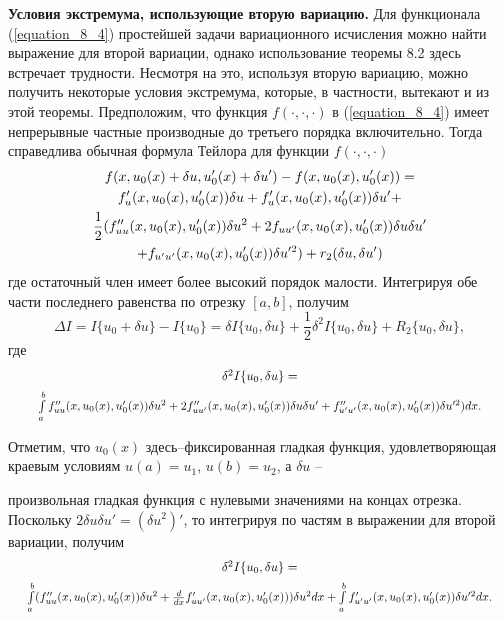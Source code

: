 {\bf Условия экстремума, использующие вторую вариацию.} Для функционала (\ref{equation_8_4}) простейшей задачи вариационного исчисления можно найти выражение для второй вариации, однако использование теоремы 8.2 здесь встречает трудности. Несмотря на это, используя вторую вариацию, можно получить некоторые условия экстремума, которые, в частности, вытекают и из этой теоремы. Предположим, что функция $f(\cdot,\cdot,\cdot)$ в (\ref{equation_8_4}) имеет непрерывные частные производные до третьего порядка включительно. Тогда справедлива обычная формула Тейлора для функции $f(\cdot,\cdot,\cdot)$
	\begin{gather}
		f(x, u_0(x)+\delta u, u_0'(x)+\delta u') - f(x, u_0(x), u_0'(x)) = \notag\\
		f_u'(x, u_0(x), u_0'(x))\delta u + f_u'(x, u_0(x), u_0'(x))\delta u' + \notag\\
		\frac{1}{2}(f_{uu}''(x, u_0(x), u_0'(x))\delta u^2 + 2f_{u{u}'}(x, u_0(x), u_0'(x))\delta u\delta u' \notag\\
		+ f_{u'u'}(x, u_0(x), u_0'(x))\delta u'^2) + r_2(\delta u, \delta u') \notag
	\end{gather}
	где остаточный член имеет более высокий порядок малости. Интегрируя обе части последнего равенства по отрезку $[a, b]$, получим
	$$\Delta I=I\{u_0+\delta u\}-I\{u_0\}=\delta I\{u_0,\delta u\}+\frac{1}{2}\delta^2 I\{u_0,\delta u\}+R_2\{u_0,\delta u\},$$
	где
	\begin{gather}
	\scalebox{.9}{$ \delta^2 I\{u_0,\delta u\}=$} \notag\\
	\scalebox{.85}{$\int\limits_a^b f_{uu}''(x, u_0(x), u_0'(x))\delta u^2 + 2f_{u{u}'}''(x, u_0(x), u_0'(x))\delta u \delta u' + f_{u'u'}''(x, u_0(x), u_0'(x))\delta u'^2)dx.$} \notag
	\end{gather}

	Отметим, что $u_0(x)$ здесь–фиксированная гладкая функция, удовлетворяющая краевым условиям $u(a)=u_1$, $u(b)=u_2$, а $\delta u$ –

	\newpage
	\noindent
	произвольная гладкая функция с нулевыми значениями на концах отрезка. Поскольку $2\delta u\delta u'=(\delta u^2)'$, то интегрируя по частям в выражении для второй вариации, получим
	\begin{gather}
	\scalebox{.9}{$ \delta^2 I\{u_0,\delta u\}=$} \notag\\
	\scalebox{.85}{$\int\limits_a^b (f_{uu}''(x, u_0(x), u_0'(x))\delta u^2 + \frac{d}{dx}f_{u{u}'}'(x, u_0(x), u_0'(x)))\delta u^2dx + \int\limits_a^b f_{u'u'}'(x, u_0(x), u_0'(x))\delta u'^2dx.$} \notag
	\end{gather}

